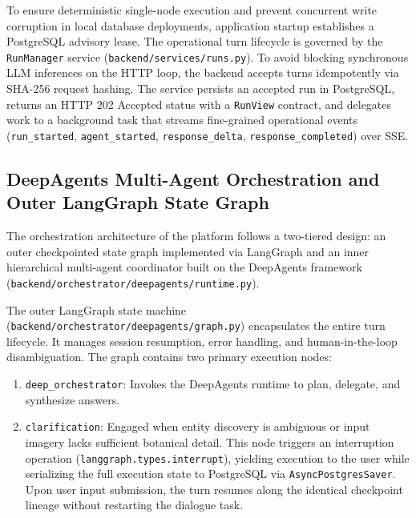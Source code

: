 To ensure deterministic single-node execution and prevent concurrent write corruption in local database deployments, application startup establishes a PostgreSQL advisory lease. The operational turn lifecycle is governed by the \texttt{RunManager} service (\texttt{backend/\allowbreak services/\allowbreak runs.py}). To avoid blocking synchronous LLM inferences on the HTTP loop, the backend accepts turns idempotently via SHA-256 request hashing. The service persists an accepted run in PostgreSQL, returns an HTTP 202 Accepted status with a \texttt{RunView} contract, and delegates work to a background task that streams fine-grained operational events (\texttt{run\_started}, \texttt{agent\_started}, \texttt{response\_delta}, \texttt{response\_completed}) over SSE.

\subsection{DeepAgents Multi-Agent Orchestration and Outer LangGraph State Graph}

The orchestration architecture of the platform follows a two-tiered design: an outer checkpointed state graph implemented via LangGraph and an inner hierarchical multi-agent coordinator built on the DeepAgents framework (\texttt{backend/\allowbreak orchestrator/\allowbreak deepagents/\allowbreak runtime.py}).

The outer LangGraph state machine (\texttt{backend/\allowbreak orchestrator/\allowbreak deepagents/\allowbreak graph.py}) encapsulates the entire turn lifecycle. It manages session resumption, error handling, and human-in-the-loop disambiguation. The graph contains two primary execution nodes:
\begin{enumerate}
    \item \texttt{deep\_orchestrator}: Invokes the DeepAgents runtime to plan, delegate, and synthesize answers.
    \item \texttt{clarification}: Engaged when entity discovery is ambiguous or input imagery lacks sufficient botanical detail. This node triggers an interruption operation (\texttt{langgraph.\allowbreak types.\allowbreak interrupt}), yielding execution to the user while serializing the full execution state to PostgreSQL via \texttt{AsyncPostgresSaver}. Upon user input submission, the turn resumes along the identical checkpoint lineage without restarting the dialogue task.
\end{enumerate}


